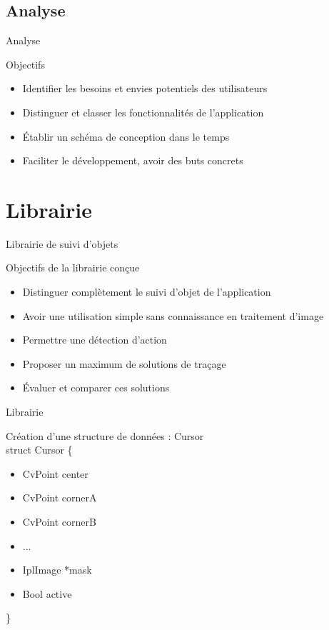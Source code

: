 \documentclass{beamer}
\begin{document}
	\subsection{Analyse}
		\begin{frame}{Analyse}
			\begin{exampleblock}{Objectifs}
				\begin{itemize}
					\item{Identifier les besoins et envies potentiels des utilisateurs}
					\item{Distinguer et classer les fonctionnalités de l'application}
					\item{Établir un schéma de conception dans le temps}
					\item{Faciliter le développement, avoir des buts concrets}
				\end{itemize}
			\end{exampleblock}
		\end{frame}
	
	\section{Librairie}
		\begin{frame}{Librairie de suivi d'objets}
			\begin{block}{Objectifs de la librairie conçue}
				\begin{itemize}
				\item{Distinguer complètement le suivi d'objet de l'application}
				\item{Avoir une utilisation simple sans connaissance en traitement d'image}
				\item{Permettre une détection d'action}
				\item{Proposer un maximum de solutions de traçage}
				\item{Évaluer et comparer ces solutions}
				\end{itemize}
			\end{block}
		\end{frame}

		\begin{frame}{Librairie}

		Création d'une structure de données : Cursor\\
		struct Cursor \{
		\begin{itemize}
			\item{CvPoint center}
			\item{CvPoint cornerA}
			\item{CvPoint cornerB}
			\item{...}
			\item{IplImage *mask}
			\item{Bool active}
		\end{itemize}
		\} \\
		\end{frame}
		
\end{document}
